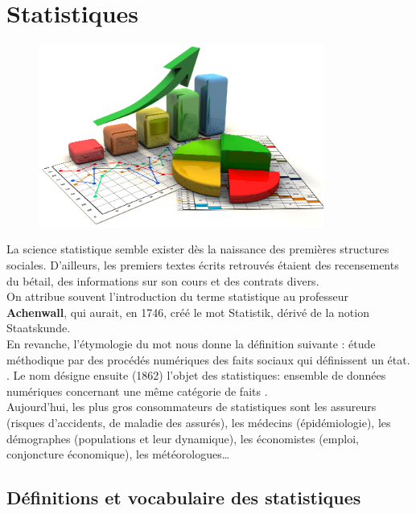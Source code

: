 \chapter{Statistiques} \label{D8}

\bigskip

\begin{figure}[h]
   \centering
      \includegraphics[height=6cm]{Organisation_gestion_donnees/Images/D8_intro_statistiques}
\end{figure}

\begin{prerequis}
La science statistique semble exister dès la naissance des premières structures sociales. D'ailleurs, les premiers textes écrits retrouvés étaient des recensements du bétail, des informations sur son cours et des contrats divers. \\
   On attribue souvent l'introduction du terme \og statistique \fg{} au professeur {\bf Achenwall}, qui aurait, en 1746, créé le mot Statistik, dérivé de la notion Staatskunde. \\
   En revanche, l'étymologie du mot nous donne la définition suivante : \og étude méthodique par des procédés numériques des faits sociaux qui définissent un état. \fg. Le nom désigne ensuite (1862) l'objet des statistiques: \og ensemble de données numériques concernant une même catégorie de faits \fg. \\
   Aujourd'hui, les plus gros consommateurs de statistiques sont les assureurs (risques d'accidents, de maladie des assurés), les médecins (épidémiologie), les démographes (populations et leur dynamique), les économistes (emploi, conjoncture économique), les météorologues\dots
\end{prerequis}


\cours %

\section{Définitions et vocabulaire des statistiques} %


